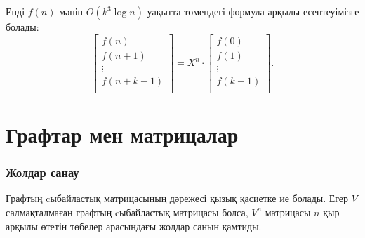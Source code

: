 \begin{samepage}
Енді $f(n)$ мәнін $O(k^3 \log n)$ уақытта 
төмендегі формула арқылы есептеуімізге болады:
\[
 \begin{bmatrix}
  f(n) \\
  f(n+1) \\
  \vdots \\
  f(n+k-1) \\
 \end{bmatrix}
=
X^n \cdot
 \begin{bmatrix}
  f(0) \\
  f(1) \\
  \vdots \\
  f(k-1) \\
 \end{bmatrix}.
\]
\end{samepage}

\section{Графтар мен матрицалар}

\subsubsection{Жолдар санау}

Графтың cыбайластық матрицасының дәрежесі
қызық қасиетке ие болады. Егер $V$ 
салмақталмаған графтың cыбайластық матрицасы болса,
$V^n$ матрицасы $n$ қыр арқылы өтетін төбелер арасындағы
жолдар санын қамтиды. 


